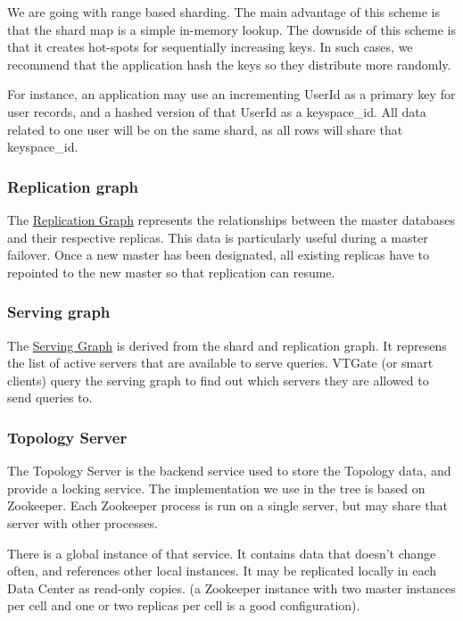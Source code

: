\documentclass{scrartcl}
\begin{document}
We are going with range based sharding.
The main advantage of this scheme is that the shard map is a simple in-memory lookup.
The downside of this scheme is that it creates hot-spots for sequentially increasing keys.
In such cases, we recommend that the application hash the keys so they
distribute more randomly.

For instance, an application may use an incrementing UserId as a primary key for user records,
and a hashed version of that UserId as a keyspace\_id. All data related to one user will be on
the same shard, as all rows will share that keyspace\_id.

\subsubsection{Replication graph}\hypertarget{replication-graph}{}\label{replication-graph}

The \href{ReplicationGraph.markdown}{Replication Graph} represents the relationships between the master
databases and their respective replicas.
This data is particularly useful during a master failover.
Once a new master has been designated, all existing replicas have to
repointed to the new master so that replication can resume.

\subsubsection{Serving graph}\hypertarget{serving-graph}{}\label{serving-graph}

The \href{ServingGraph.markdown}{Serving Graph} is derived from the shard and replication graph.
It represens the list of active servers that are available to serve
queries.
VTGate (or smart clients) query the serving graph to find out which servers
they are allowed to send queries to.

\subsubsection{Topology Server}\hypertarget{topology-server}{}\label{topology-server}

The Topology Server is the backend service used to store the Topology data, and provide a locking service. The implementation we use in the tree is based on Zookeeper. Each Zookeeper process is run on a single server, but may share that server with other processes.

There is a global instance of that service. It contains data that doesn't change often, and references other local instances. It may be replicated locally in each Data Center as read-only copies. (a Zookeeper instance with two master instances per cell and one or two replicas per cell is a good configuration).
\end{document}
